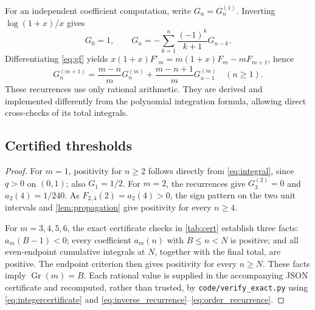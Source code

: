 \documentclass[11pt]{article}
\numberwithin{equation}{section}
\newtheorem{proposition}[theorem]{Proposition}
\theoremstyle{definition}
\newcommand{\Gr}{\operatorname{Gr}}
\begin{document}
For an independent coefficient computation, write $G_n=G_n^{(1)}$.
Inverting $\log(1+x)/x$ gives
\begin{equation}\label{eq:inverse_recurrence}
 G_0=1,\qquad
 G_n=-\sum_{k=1}^n\frac{(-1)^k}{k+1}G_{n-k}.
\end{equation}
Differentiating \eqref{eq:gf} yields
$x(1+x)F'_m=m(1+x)F_m-mF_{m+1}$, hence
\begin{equation}\label{eq:order_recurrence}
 G_n^{(m+1)}=\frac{m-n}{m}G_n^{(m)}
                  +\frac{m-n+1}{m}G_{n-1}^{(m)}\quad(n\ge1).
\end{equation}
These recurrences use only rational arithmetic. They are derived and
implemented differently from the polynomial integration formula, allowing
direct cross-checks of its total integrals.

\subsection{Certified thresholds}
\begin{proof}
For $m=1$, positivity for $n\ge2$ follows directly from
\eqref{eq:integral}, since $q>0$ on $(0,1)$; also $G_1=1/2$.
For $m=2$, the recurrences give $G_3^{(2)}=0$ and
$a_2(4)=1/240$. As $F_{2,4}(2)=a_2(4)>0$, the sign pattern on the two
unit intervals and \cref{lem:propagation} give positivity for every
$n\ge4$.

For $m=3,4,5,6$, the exact certificate checks in \cref{tab:cert} establish
three facts: $a_m(B-1)<0$; every coefficient $a_m(n)$ with
$B\le n<N$ is positive; and all even-endpoint cumulative integrals at
$N$, together with the final total, are positive. The endpoint criterion
then gives positivity for every $n\ge N$. These facts imply
$\Gr(m)=B$. Each rational value is supplied in the accompanying JSON
certificate and recomputed, rather than trusted, by
\texttt{code/verify\_exact.py} using \eqref{eq:integercertificate} and
\eqref{eq:inverse_recurrence}--\eqref{eq:order_recurrence}.
\end{proof}
\end{document}
